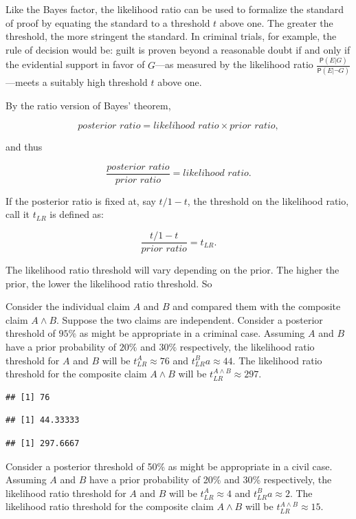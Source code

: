 \documentclass[10pt,dvipsnames,enabledeprecatedfontcommands]{scrartcl}
\newcommand{\pr}[1]{\mathsf{P}(#1)}
\begin{document}
Like the Bayes factor, the likelihood ratio can be used to formalize the
standard of proof by equating the standard to a threshold \(t\) above
one. The greater the threshold, the more stringent the standard. In
criminal trials, for example, the rule of decision would be: guilt is
proven beyond a reasonable doubt if and only if the evidential support
in favor of \(G\)---as measured by the likelihood ratio
\(\frac{\pr{E \vert G}}{\pr{E \vert \neg G}}\)---meets a suitably high
threshold \(t\) above one.

By the ratio version of Bayes' theorem,

\[\textit{posterior ratio} = \textit{likelihood ratio} \times \textit{prior ratio},\]

and thus

\[\frac{\textit{posterior ratio}}{\textit{prior ratio}} = \textit{likelihood ratio}.\]

If the posterior ratio is fixed at, say \(t/1-t\), the threshold on the
likelihood ratio, call it \(t_{LR}\) is defined as:

\[\frac{t/1-t}{\textit{prior ratio}} = t_{LR}.\]

\noindent The likelihood ratio threshold will vary depending on the
prior. The higher the prior, the lower the likelihood ratio threshold.
So

Consider the individual claim \(A\) and \(B\) and compared them with the
composite claim \(A \wedge B\). Suppose the two claims are independent.
Consider a posterior threshold of \(95\%\) as might be appropriate in a
criminal case. Assuming \(A\) and \(B\) have a prior probability of
\(20\%\) and \(30\%\) respectively, the likelihood ratio threshold for
\(A\) and \(B\) will be \(t_{LR}^{A}\approx 76\) and
\(t_{LR}^{B}a\approx 44\). The likelihood ratio threshold for the
composite claim \(A \wedge B\) will be
\(t^{A\wedge B}_{LR}\approx 297\).

\begin{verbatim}
## [1] 76
\end{verbatim}

\begin{verbatim}
## [1] 44.33333
\end{verbatim}

\begin{verbatim}
## [1] 297.6667
\end{verbatim}

Consider a posterior threshold of 50\% as might be appropriate in a
civil case. Assuming \(A\) and \(B\) have a prior probability of 20\%
and 30\% respectively, the likelihood ratio threshold for \(A\) and
\(B\) will be \(t_{LR}^{A}\approx 4\) and \(t_{LR}^{B}a\approx 2\). The
likelihood ratio threshold for the composite claim \(A \wedge B\) will
be \(t^{A\wedge B}_{LR}\approx 15\).
\end{document}
